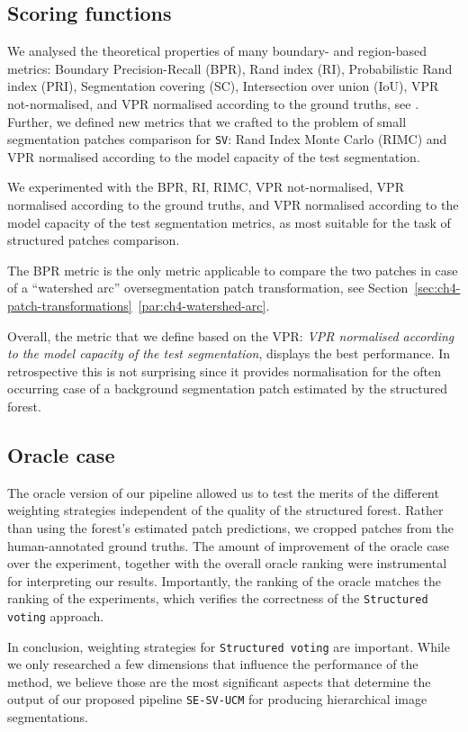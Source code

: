 \subsection{Scoring functions}
\label{sec:ch6-scoring-functions}
We analysed the theoretical properties of many boundary- and region-based metrics: Boundary Precision-Recall (BPR), Rand index (RI), Probabilistic Rand index (PRI), Segmentation covering (SC), Intersection over union (IoU), VPR not-normalised, and VPR normalised according to the ground truths, see . Further, we defined new metrics that we crafted to the %
problem of small segmentation patches comparison for {\tt SV}: Rand Index Monte Carlo (RIMC) and VPR normalised according to the model capacity of the test segmentation. 

We experimented with the BPR, RI, RIMC, VPR not-normalised, VPR normalised according to the ground truths, and VPR normalised according to the model capacity of the test segmentation metrics, as most suitable for the task of structured patches comparison.

The BPR metric is the only metric applicable to compare the two patches in case of a ``watershed arc'' oversegmentation patch transformation, see Section~\ref*{sec:ch4-patch-transformations}~\ref{par:ch4-watershed-arc}.

Overall, the metric that we define based on the VPR: {\it VPR normalised according to the model capacity of the test segmentation}, displays 
the best performance. In retrospective this is not surprising since it provides normalisation for the often occurring case of a background segmentation patch estimated by the structured forest.

\subsection{Oracle case}
The oracle version of our pipeline allowed us to test the merits %
of the different weighting strategies independent of the quality of the structured forest. Rather than using the forest's estimated patch predictions, we cropped patches from the human-annotated ground truths. The amount of improvement of the oracle case over the experiment, together with the overall oracle ranking were instrumental for interpreting our results. Importantly, the ranking of the oracle matches the ranking of the experiments, which verifies the correctness of the {\tt Structured voting} approach.

In conclusion, weighting strategies for {\tt Structured voting} are important. While we only researched a few dimensions that influence the performance of the method, we believe those are the most significant %
aspects that determine the output of our proposed pipeline {\tt SE-SV-UCM} for producing hierarchical image segmentations.
